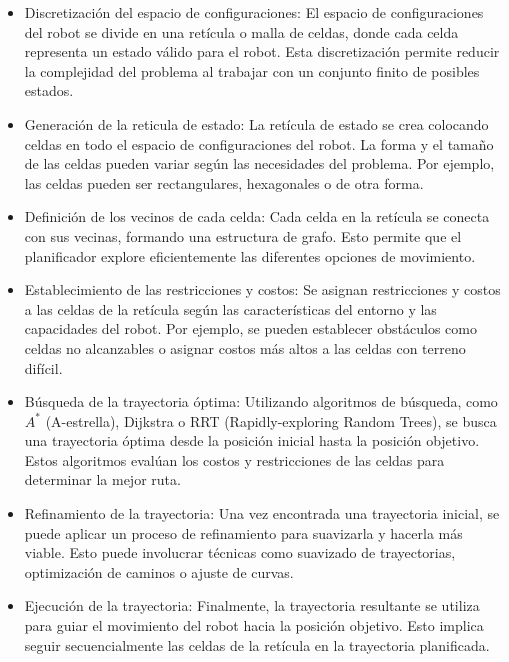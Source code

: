 \documentclass{article}
\begin{document}
\begin{itemize}
  \begin{itemize}
  \item Discretización del espacio de configuraciones: El espacio de configuraciones del robot se divide en una retícula o malla de celdas, donde cada celda representa un estado válido para el robot. Esta discretización permite reducir la complejidad del problema al trabajar con un conjunto finito de posibles estados.
  \item Generación de la reticula de estado: La retícula de estado se crea colocando celdas en todo el espacio de configuraciones del robot. La forma y el tamaño de las celdas pueden variar según las necesidades del problema. Por ejemplo, las celdas pueden ser rectangulares, hexagonales o de otra forma.
  \item Definición de los vecinos de cada celda: Cada celda en la retícula se conecta con sus vecinas, formando una estructura de grafo. Esto permite que el planificador explore eficientemente las diferentes opciones de movimiento.
  \item Establecimiento de las restricciones y costos: Se asignan restricciones y costos a las celdas de la retícula según las características del entorno y las capacidades del robot. Por ejemplo, se pueden establecer obstáculos como celdas no alcanzables o asignar costos más altos a las celdas con terreno difícil.
  \item Búsqueda de la trayectoria óptima: Utilizando algoritmos de búsqueda, como $A^{*}$ (A-estrella), Dijkstra o RRT (Rapidly-exploring Random Trees), se busca una trayectoria óptima desde la posición inicial hasta la posición objetivo. Estos algoritmos evalúan los costos y restricciones de las celdas para determinar la mejor ruta.
  \item Refinamiento de la trayectoria: Una vez encontrada una trayectoria inicial, se puede aplicar un proceso de refinamiento para suavizarla y hacerla más viable. Esto puede involucrar técnicas como suavizado de trayectorias, optimización de caminos o ajuste de curvas.
  \item Ejecución de la trayectoria: Finalmente, la trayectoria resultante se utiliza para guiar el movimiento del robot hacia la posición objetivo. Esto implica seguir secuencialmente las celdas de la retícula en la trayectoria planificada.
  \end{itemize}
  
\end{itemize}
\end{document}
